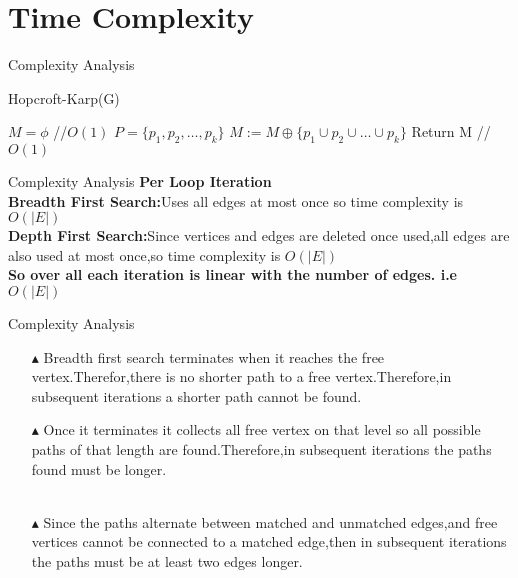 \documentclass{beamer}
\begin{document}
\section{Time Complexity}
\begin{frame}{Complexity Analysis}
\renewcommand{\thealgorithm}{}
\begin{algorithm}[H]
\caption{Hopcroft-Karp(G)}
\begin{algorithmic}[1]
\State $M=\phi$ {\tiny //$O(1)$}
\Repeat 
\State $P=\{p_1,p_2,\dots,p_k\}$ 
\State $M:=M\oplus\{p_1 \cup p_2 \cup \dots \cup p_k\}$
\State Return M {\tiny //$O(1)$}
\end{algorithmic}
\end{algorithm}
\end{frame}

\begin{frame}{Complexity Analysis}
    \textbf{\small Per Loop Iteration}\\
    \textbf{\small Breadth First Search:}Uses all edges at most once so time complexity is $O(|E|)$\\
    \textbf{\small Depth First Search:}Since vertices and edges are deleted once used,all edges are also used at most once,so time complexity is $O(|E|)$\\
    \textbf{\big So over all each iteration is linear with the number of edges. i.e $O(|E|)$}
\end{frame}

\begin{frame}{Complexity Analysis}
\begin{itemize}
    \item[$\blacktriangle$] Breadth first search terminates when it reaches the free vertex.Therefor,there is no shorter path to a free vertex.Therefore,in subsequent iterations a shorter path cannot be found.\\
    \vspace{.2cm}
    \item[$\blacktriangle$] Once it terminates it collects all free vertex on that level so all possible paths of that length are found.Therefore,in subsequent iterations the paths found must be longer. \\ \\
    \vspace{.2cm}
    \item[$\blacktriangle$] Since the paths alternate between matched and unmatched edges,and free vertices cannot be connected to a matched edge,then in subsequent iterations the paths must be at least two edges longer.\\
\end{itemize}
    
\end{frame}
\end{document}
